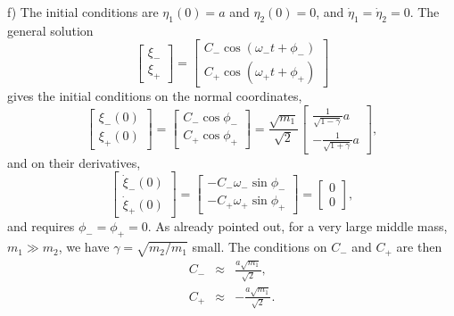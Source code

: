 \documentclass[letterpaper,11pt]{article}
\begin{document}
f) The initial conditions are $\eta_1(0) = a$ and $\eta_2(0) = 0$, and $\dot\eta_1 = \dot\eta_2 = 0$.  The general solution
\begin{equation*}
 \left[ \begin{array}{c}
  \xi_- \\
  \xi_+
 \end{array} \right] = 
 \left[ \begin{array}{c}
  C_- \cos (\omega_- t + \phi_-) \\
  C_+ \cos (\omega_+ t + \phi_+)
 \end{array} \right]
\end{equation*}
gives the initial conditions on the normal coordinates,
\begin{equation*}
 \left[ \begin{array}{c}
  \xi_-(0) \\
  \xi_+(0)
 \end{array} \right] = 
 \left[ \begin{array}{c}
  C_- \cos \phi_- \\
  C_+ \cos \phi_+
 \end{array} \right] = \frac{\sqrt{m_1}}{\sqrt{2}}
 \left[ \begin{array}{c}
  \frac{1}{\sqrt{1 - \gamma}} a \\
- \frac{1}{\sqrt{1 + \gamma}} a
 \end{array} \right],
\end{equation*}
and on their derivatives,
\begin{equation*}
 \left[ \begin{array}{c}
  \dot\xi_-(0) \\
  \dot\xi_+(0)
 \end{array} \right] = 
 \left[ \begin{array}{c}
  - C_- \omega_- \sin \phi_- \\
  - C_+ \omega_+ \sin \phi_+
 \end{array} \right] =
 \left[ \begin{array}{c}
  0 \\
  0
 \end{array} \right],
\end{equation*}
and requires $\phi_- = \phi_+ = 0$.  As already pointed out, for a very large middle mass, $m_1 \gg m_2$, we have $\gamma = \sqrt{m_2/m_1}$ small.  The conditions on $C_-$ and $C_+$ are then
\begin{eqnarray*}
 C_- & \approx & \frac{a\sqrt{m_1}}{\sqrt{2}}, \\
 C_+ & \approx & - \frac{a\sqrt{m_1}}{\sqrt{2}}.
\end{eqnarray*}
\end{document}
